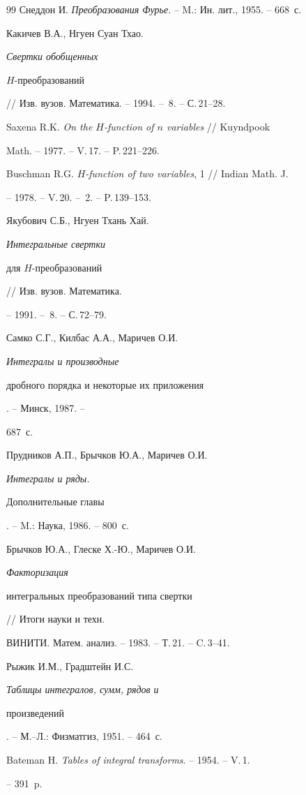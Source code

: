 \begin{thebibliography}{99}
Снеддон И. {\em Преобразования Фурье}. -- M.: Ин. лит., 1955. -- 668~с. 




Какичев В.А., Нгуен Суан Тхао. {\em Свертки обобщенных 


$H$-преобразований} 


// Изв. вузов. Математика. -- 1994. -- \No\,8. -- С.\,21--28. 




Saxena R.K. {\em On the $H$-function of $n$ variables} // Kuyndpook 


Math. -- 1977. -- V.\,17. -- P.\,221--226. 




Buschman R.G. {\em $H$-function of two variables}, 1 // Indian Math. J. 


-- 1978. -- V.\,20. -- \No\,2. -- P.\,139--153. 




Якубович С.Б., Нгуен Тхань Хай. {\em Интегральные свертки 


для $H$-преобразований} // Изв. вузов. Математика. 


-- 1991. -- \No\,8. -- С.\,72--79. 




Самко С.Г., Килбас А.А., Маричев О.И. {\em Интегралы и производные 


дробного порядка и некоторые их приложения}. -- Минск, 1987. -- 


687~с. 




Прудников А.П., Брычков Ю.А., Маричев О.И. {\em Интегралы и ряды.


Дополнительные главы}. -- M.: Наука, 1986. -- 800~с. 




Брычков Ю.А., Глеске Х.-Ю., Маричев О.И. {\em Факторизация 


интегральных преобразований типа свертки} // Итоги науки и техн. 


ВИНИТИ. Матем. анализ. -- 1983. -- Т.\,21. -- C.\,3--41. 




Рыжик И.М., Градштейн И.С. {\em Таблицы интегралов, сумм, рядов и 


произведений}. -- М.--Л.: Физматгиз, 1951. -- 464~с. 




Bateman H. {\em Tables of integral transforms}. -- 1954. -- V.\,1. 


-- 391~p. 


 


\end{thebibliography} 


 


\vskip 2cm 


 








\label{end} 


 


